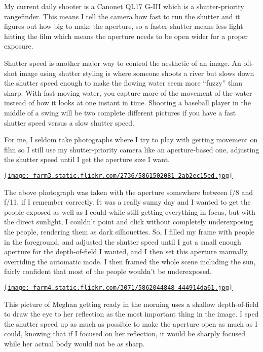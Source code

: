 My current daily shooter is a Canonet QL17 G-III which is a
shutter-priority rangefinder. This means I tell the camera how fast to
run the shutter and it figures out how big to make the aperture, so a
faster shutter means less light hitting the film which means the
aperture needs to be open wider for a proper exposure.

Shutter speed is another major way to control the aesthetic of an image.
An oft-shot image using shutter styling is where someone shoots a river
but slows down the shutter speed enough to make the flowing water seem
more ``fuzzy'' than sharp. With fast-moving water, you capture more of
the movement of the water instead of how it looks at one instant in
time. Shooting a baseball player in the middle of a swing will be two
complete different pictures if you have a fast shutter speed versus a
slow shutter speed.

For me, I seldom take photographs where I try to play with getting
movement on film so I still use my shutter-priority camera like an
aperture-based one, adjusting the shutter speed until I get the aperture
size I want.

\href{http://www.flickr.com/photos/nolancaudill/5861502081/}{\texttt{[image: farm3.static.flickr.com/2736/5861502081\_2ab2ec15ed.jpg]}}

The above photograph was taken with the aperture somewhere between f/8
and f/11, if I remember correctly. It was a really sunny day and I
wanted to get the people exposed as well as I could while still getting
everything in focus, but with the direct sunlight, I couldn't point and
click without completely underexposing the people, rendering them as
dark silhouettes. So, I filled my frame with people in the foreground,
and adjusted the shutter speed until I got a small enough aperture for
the depth-of-field I wanted, and I then set this aperture manually,
overriding the automatic mode. I then framed the whole scene including
the sun, fairly confident that most of the people wouldn't be
underexposed.

\href{http://www.flickr.com/photos/nolancaudill/5862044848/}{\texttt{[image: farm4.static.flickr.com/3071/5862044848\_444914da61.jpg]}}

This picture of Meghan getting ready in the morning uses a shallow
depth-of-field to draw the eye to her reflection as the most important
thing in the image. I sped the shutter speed up as much as possible to
make the aperture open as much as I could, knowing that if I focused on
her reflection, it would be sharply focused while her actual body would
not be as sharp.

